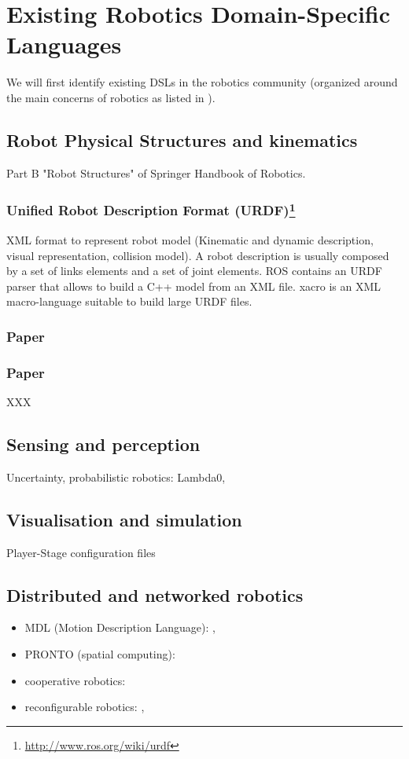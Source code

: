 \documentclass[jou]{apa}
\begin{document}
\section{Existing Robotics Domain-Specific Languages} %
\label{sec:Existing_Robotics_Domain-Specific_Languages}
We will first identify existing DSLs in the robotics community (organized around the main concerns of robotics as listed in \cite{SpringerHandbook:2008fk}).
\subsection{Robot Physical Structures and kinematics}
Part B "Robot Structures" of Springer Handbook of Robotics.

\subsubsection{Unified Robot Description Format (URDF)\footnote{\url{http://www.ros.org/wiki/urdf}}}
XML format to represent robot model (Kinematic and dynamic description, visual representation, collision model).
A robot description is usually composed by a set of links elements and a set of joint elements.
ROS contains an URDF parser that allows to build a C++ model from an XML file.
xacro is an XML macro-language suitable to build large URDF files.

\subsubsection{Paper\cite{Brugali:2007uq}}

\subsubsection{Paper\cite{Frigerio:2011fk}}
XXX

\subsection{Sensing and perception}
Uncertainty, probabilistic robotics: Lambda0, \cite{Thrun:2000}
\subsection{Visualisation and simulation}
Player-Stage configuration files\cite{Collett:2005bq}
\subsection{Distributed and networked robotics}
\begin{itemize}
\item MDL (Motion Description Language): \cite{Martin:2008vn}, \cite{Martin:2010uq}
\item PRONTO (spatial computing): \cite{Bachrach:2008bs}
\item cooperative robotics: \cite{Welborn:2005dg}
\item reconfigurable robotics: \cite{Schultz:2007le}, \cite{Schultz:2008vl}
\end{itemize}
\end{document}
